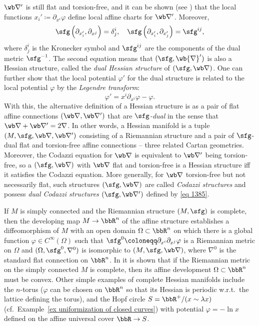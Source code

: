\begin{example}
    $\wb\nabla'$ is still flat and torsion-free, and it can be shown (see \cite{Shima}) that the local functions $x_i'\coloneqq \partial_{x^i}\varphi$ define local affine charts for $\wb\nabla'$. Moreover, 
    \[\sfg\left(\partial_{x_i'},\partial_{x^j}\right)=\delta^i_j,\quad \sfg\left(\partial_{x_i'},\partial_{x_j'}\right)=\sfg^{ij},\]
    where $\delta^i_j$ is the Kronecker symbol and $\sfg^{ij}$ are the components of the dual metric $\sfg^{-1}$. The second equation means that $(\sfg,\wb{\nabla}')$ is also a Hessian structure, called the \emph{dual Hessian structure} of $(\sfg,\wb\nabla)$. One can further show that the local potential $\varphi'$ for the dual structure is related to the local potential $\varphi$ by the \emph{Legendre transform}:
    \[\varphi'=x^i\partial_{x^i}\varphi-\varphi.\]
    With this, the alternative definition of a Hessian structure is as a pair of flat affine connections $(\wb\nabla,\wb\nabla')$ that are \emph{$\sfg$-dual} in the sense that $\wb\nabla+\wb\nabla'=2\nabla$. In other words, a Hessian manifold is a tuple $(M,\sfg,\wb\nabla,\wb\nabla')$ consisting of a Riemannian structure and a pair of $\sfg$-dual flat and torsion-free affine connections -- three related Cartan geometries. Moreover, the Codazzi equation for $\wb\nabla$ is equivalent to $\wb\nabla'$ being torsion-free, so a $(\sfg,\wb\nabla)$ with $\wb\nabla$ flat and torsion-free is a Hessian structure iff it satisfies the Codazzi equation. More generally, for $\wb\nabla$ torsion-free but not necessarily flat, such structures $(\sfg,\wb\nabla)$ are called \emph{Codazzi structures} and possess \emph{dual Codazzi structures} $(\sfg,\wb\nabla')$ defined by \eqref{eq 1385}.

    If $M$ is simply connected and the Riemannian structure $(M,\sfg)$ is complete, then the developing map $M\to \bbR^n$ of the affine structure establishes a diffeomorphism of $M$ with an open domain $\Omega\subset \bbR^n$ on which there is a global function $\varphi\in C^\infty(\Omega)$ such that $\sfg^0\coloneqq \partial_{x^i}\partial_{x^j}\varphi$ is a Riemannian metric on $\Omega$ and $(\Omega,\sfg^0,\nabla^0)$ is isomorphic to $(M,\sfg,\wb\nabla)$, where $\nabla^0$ is the standard flat connection on $\bbR^n$. In \cite{Shima95} it is shown that if the Riemannian metric on the simply connected $M$ is complete, then its affine development $\Omega\subset\bbR^n$ must be convex. Other simple examples of complete Hessian manifolds include the $n$-torus ($\varphi$ can be chosen on $\bbR^n$ so that its Hessian is periodic w.r.t.\ the lattice defining the torus), and the Hopf circle $S=\bbR^+\slash (x\sim \lambda x)$ (cf.\ Example~\ref{ex uniformization of closed curves}) with potential $\varphi=-\ln x$ defined on the affine universal cover $\bbR\to S$.


\end{example}

